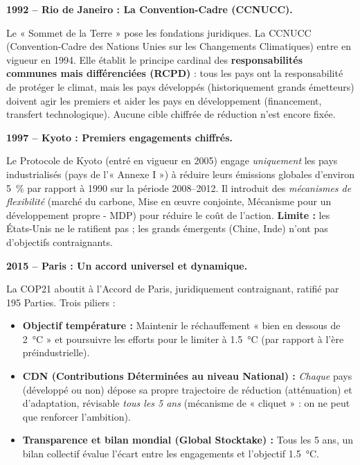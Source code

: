\documentclass[11pt]{article}
\newcommand{\cle}[1]{{\popxbold\color{popdark}#1}}
\begin{document}
\textbf{1992 -- Rio de Janeiro : La Convention-Cadre (CCNUCC).}\par
Le « Sommet de la Terre » pose les fondations juridiques. La \cle{CCNUCC} (Convention-Cadre des Nations Unies sur les Changements Climatiques) entre en vigueur en 1994. Elle établit le principe cardinal des \textbf{responsabilités communes mais différenciées (RCPD)} : tous les pays ont la responsabilité de protéger le climat, mais les pays développés (historiquement grands émetteurs) doivent agir les premiers et aider les pays en développement (financement, transfert technologique). Aucune cible chiffrée de réduction n'est encore fixée.

\textbf{1997 -- Kyoto : Premiers engagements chiffrés.}\par
Le \cle{Protocole de Kyoto} (entré en vigueur en 2005) engage \emph{uniquement} les pays industrialisés (pays de l'« Annexe I ») à réduire leurs émissions globales d'environ \SI{5}{\%} par rapport à 1990 sur la période 2008--2012. Il introduit des \emph{mécanismes de flexibilité} (marché du carbone, Mise en œuvre conjointe, Mécanisme pour un développement propre - MDP) pour réduire le coût de l'action. \textbf{Limite :} les États-Unis ne le ratifient pas ; les grands émergents (Chine, Inde) n'ont pas d'objectifs contraignants.

\textbf{2015 -- Paris : Un accord universel et dynamique.}\par
La COP21 aboutit à l'\cle{Accord de Paris}, juridiquement contraignant, ratifié par 195 Parties. Trois piliers :
\begin{itemize}
    \item \textbf{Objectif température :} Maintenir le réchauffement « bien en dessous de \SI{2}{\celsius} » et poursuivre les efforts pour le limiter à \SI{1,5}{\celsius} (par rapport à l'ère préindustrielle).
    \item \textbf{CDN (Contributions Déterminées au niveau National) :} \emph{Chaque} pays (développé ou non) dépose sa propre trajectoire de réduction (atténuation) et d'adaptation, révisable \emph{tous les 5 ans} (mécanisme de « cliquet » : on ne peut que renforcer l'ambition).
    \item \textbf{Transparence et bilan mondial (Global Stocktake) :} Tous les 5 ans, un bilan collectif évalue l'écart entre les engagements et l'objectif \SI{1,5}{\celsius}.
\end{itemize}
\end{document}
